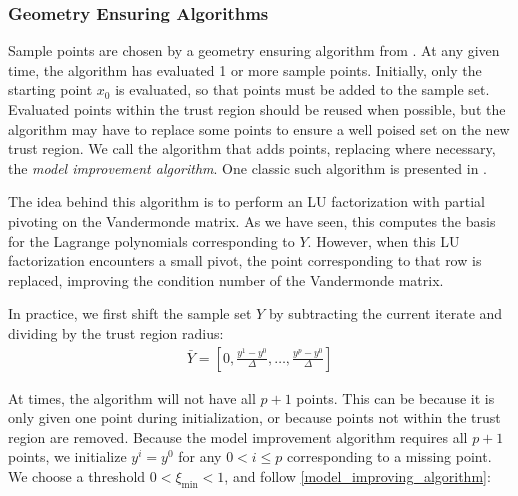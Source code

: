\documentclass{article}
\theoremstyle{case}
\newcommand{\ximin}{\xi_{\text{min}}}
\begin{document}
\subsubsection{Geometry Ensuring Algorithms}

Sample points are chosen by a geometry ensuring algorithm from \cite{DUMMY:intro_book}.
At any given time, the algorithm has evaluated 1 or more sample points.
Initially, only the starting point $x_0$ is evaluated, so that points must be added to the sample set.
Evaluated points within the trust region should be reused when possible, but the algorithm may have to replace some points to ensure a well poised set on the new trust region.
We call the algorithm that adds points, replacing where necessary, the \emph{model improvement algorithm}.
One classic such algorithm is presented in \cite{DUMMY:intro_book}.

The idea behind this algorithm is to perform an LU factorization with partial pivoting on the Vandermonde matrix.
As we have seen, this computes the basis for the Lagrange polynomials corresponding to $Y$.
However, when this LU factorization encounters a small pivot, the point corresponding to that row is replaced, improving the condition number of the Vandermonde matrix.

In practice, we first shift the sample set $Y$ by subtracting the current iterate and dividing by the trust region radius:
\begin{align}
\bar{Y} = [0, \frac{y^1 - y^0}{\Delta}, \ldots, \frac{y^p - y^0}{\Delta}]
\end{align}

At times, the algorithm will not have all $p+1$ points.
This can be because it is only given one point during initialization, or because points not within the trust region are removed.
Because the model improvement algorithm requires all $p+1$ points, we initialize $y^i = y^0$ for any $0 < i \le p$ corresponding to a missing point.
We choose a threshold $0 < \ximin < 1$, and follow \cref{model_improving_algorithm}:
\end{document}
